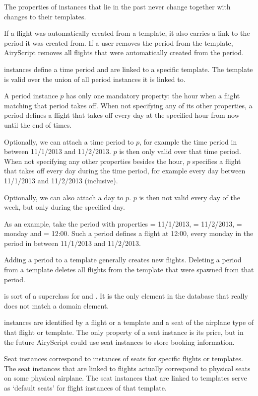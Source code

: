 \begin{description}
    The properties of  instances that lie in the past never change
    together with changes to their templates.

    If a flight was automatically created from a template, it also carries a
    link to the period it was created from. If a user removes the period from
    the template, AiryScript removes all flights that were automatically created
    from the period.

  \item[\dbf{Period}] instances define a time period and are linked to a
    specific template. The template is valid over the union of all period
    instances it is linked to.

    A period instance $p$ has only one mandatory property: the hour when a
    flight matching that period takes off. When not specifying any of its other
    properties, a period defines a flight that takes off every day at the
    specified hour from now until the end of times.

    Optionally, we can attach a time period to $p$, for example the time period
    in between 11/1/2013 and 11/2/2013. $p$ is then only valid over that time
    period. When not specifying any other properties besides the hour, $p$
    specifies a flight that takes off every day during the time period, for
    example every day between 11/1/2013 and 11/2/2013 (inclusive).

    Optionally, we can also attach a day to $p$. $p$ is then not valid every
    day of the week, but only during the specified day.

    As an example, take the period with properties  = 11/1/2013,
     = 11/2/2013,  = monday and  =
    12:00. Such a period defines a flight at 12:00, every monday in the period
    in between 11/1/2013 and 11/2/2013.

    Adding a period to a template generally creates new flights. Deleting a
    period from a template deletes all flights from the template that were
    spawned from that period.
    
  \item[\dbf{Bookable}] is sort of a superclass for  and
    . It is the only element in the database that really does not
    match a domain element.

  \item[\dbf{SeatInstance}] instances are identified by a flight or a template
    and a seat of the airplane type of that flight or template. The only
    property of a seat instance is its price, but in the future AiryScript could
    use seat instances to store booking information.
    
    Seat instances correspond to instances of seats for specific flights or
    templates. The seat instances that are linked to flights actually correspond
    to physical seats on some physical airplane. The seat instances that are
    linked to templates serve as ‘default seats’ for flight instances of that
    template.
\end{description}
